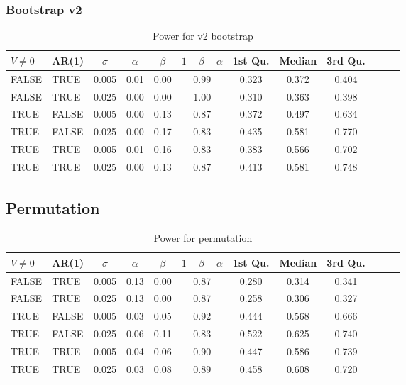 \documentclass{article}
\begin{document}
\subsubsection{Bootstrap v2}

\begin{table}[H]
\centering
\begin{tabular}{llcccccccccc}
  \hline
$V \not= 0$ & AR(1) & $\sigma$  & $\alpha$ & $\beta$ & $1 - \beta - \alpha$  & 1st Qu. & Median & 3rd Qu. \\ 
  \hline
FALSE & TRUE & 0.005 & 0.01 & 0.00 & 0.99 & 0.323 & 0.372 & 0.404 \\ 
  FALSE & TRUE & 0.025 & 0.00 & 0.00 & 1.00 & 0.310 & 0.363 & 0.398 \\ 
  TRUE & FALSE & 0.005 & 0.00 & 0.13 & 0.87 & 0.372 & 0.497 & 0.634 \\ 
  TRUE & FALSE & 0.025 & 0.00 & 0.17 & 0.83 & 0.435 & 0.581 & 0.770 \\ 
  TRUE & TRUE & 0.005 & 0.01 & 0.16 & 0.83 & 0.383 & 0.566 & 0.702 \\ 
  TRUE & TRUE & 0.025 & 0.00 & 0.13 & 0.87 & 0.413 & 0.581 & 0.748 \\
   \hline
\end{tabular}
\caption{Power for v2 bootstrap} 
\label{tab:good_boot_pwr}
\end{table}

\subsection{Permutation}

\begin{table}[H]
\centering
\begin{tabular}{llcccccccccc}
  \hline
$V \not= 0$ & AR(1) & $\sigma$  & $\alpha$ & $\beta$ & $1 - \beta - \alpha$  & 1st Qu. & Median & 3rd Qu.  \\ 
  \hline
FALSE & TRUE & 0.005 & 0.13 & 0.00 & 0.87 & 0.280 & 0.314 & 0.341 \\ 
  FALSE & TRUE & 0.025 & 0.13 & 0.00 & 0.87 & 0.258 & 0.306 & 0.327 \\ 
  TRUE & FALSE & 0.005 & 0.03 & 0.05 & 0.92 & 0.444 & 0.568 & 0.666 \\ 
  TRUE & FALSE & 0.025 & 0.06 & 0.11 & 0.83 & 0.522 & 0.625 & 0.740 \\ 
  TRUE & TRUE & 0.005 & 0.04 & 0.06 & 0.90 & 0.447 & 0.586 & 0.739 \\ 
  TRUE & TRUE & 0.025 & 0.03 & 0.08 & 0.89 & 0.458 & 0.608 & 0.720 \\ 
   \hline
\end{tabular}
\caption{Power for permutation} 
\label{tab:perm_pwr}
\end{table}
\end{document}
